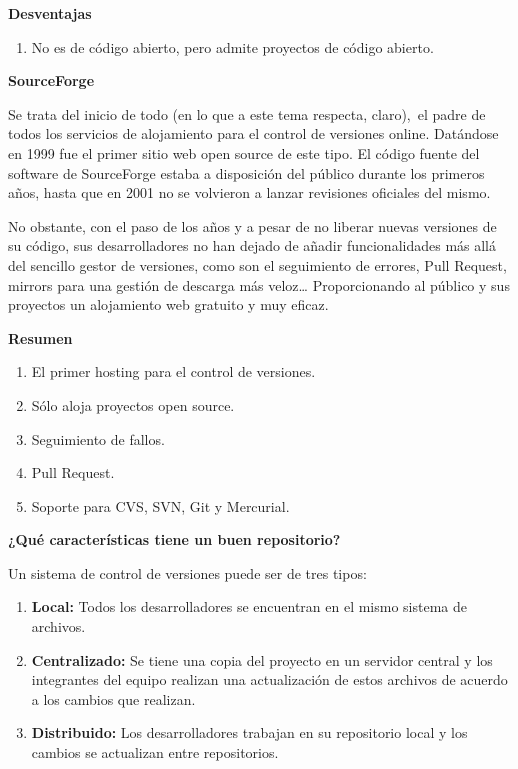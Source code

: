 \documentclass{article} %
\begin{document}
\noindent \textbf{Desventajas}

\begin{enumerate}
\item \textbf{ }No es de c\'{o}digo abierto, pero admite proyectos de c\'{o}digo abierto.
\end{enumerate}

\noindent 

\noindent \textbf{SourceForge}

\noindent Se trata del inicio de todo (en lo que a este tema respecta, claro),~el padre de todos los servicios de alojamiento para el control de versiones online. Dat\'{a}ndose en 1999 fue el primer sitio web open source de este tipo. El c\'{o}digo fuente del software de SourceForge estaba a disposici\'{o}n del p\'{u}blico durante los primeros a\~{n}os, hasta que en 2001 no se volvieron a lanzar revisiones oficiales del mismo.

\noindent No obstante, con el paso de los a\~{n}os y a pesar de no liberar nuevas versiones de su c\'{o}digo, sus desarrolladores no han dejado de a\~{n}adir funcionalidades m\'{a}s all\'{a} del sencillo gestor de versiones, como son el seguimiento de errores, Pull Request, mirrors para una gesti\'{o}n de descarga m\'{a}s veloz{\dots} Proporcionando al p\'{u}blico y sus proyectos un alojamiento web gratuito y muy eficaz.

\noindent \textbf{Resumen}

\begin{enumerate}
\item \textbf{ }El primer hosting para el control de versiones.

\item  S\'{o}lo aloja proyectos open source.

\item  Seguimiento de fallos.

\item  Pull Request.

\item  Soporte para CVS, SVN, Git y Mercurial.
\end{enumerate}

\noindent 

\noindent \textbf{¿Qu\'{e} caracter\'{i}sticas tiene un buen repositorio?}

\noindent Un sistema de control de versiones puede ser de tres tipos:

\begin{enumerate}
\item  \textbf{Local:} Todos los desarrolladores se encuentran en el mismo sistema de archivos.

\item  \textbf{Centralizado:} Se tiene una copia del proyecto en un servidor central y los integrantes del equipo realizan una actualizaci\'{o}n de estos archivos de acuerdo a los cambios que realizan.

\item  \textbf{Distribuido:} Los desarrolladores trabajan en su repositorio local y los cambios se actualizan entre repositorios.
\end{enumerate}
\end{document}
